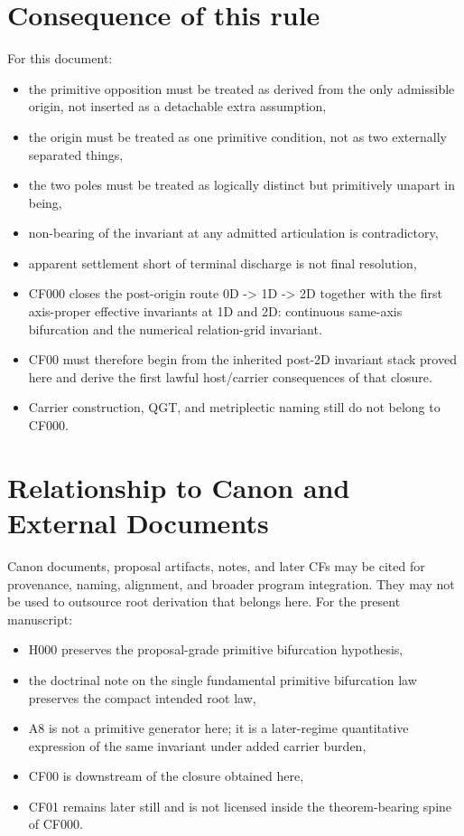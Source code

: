 \documentclass[11pt]{article}
\begin{document}
\section{Consequence of this rule}\label{consequence-of-this-rule}

For this document:

\begin{itemize}
\item
  the primitive opposition must be treated as derived from the only admissible origin, not inserted as a detachable extra assumption,
\item
  the origin must be treated as one primitive condition, not as two externally separated things,
\item
  the two poles must be treated as logically distinct but primitively unapart in being,
\item
  non-bearing of the invariant at any admitted articulation is contradictory,
\item
  apparent settlement short of terminal discharge is not final resolution,
\item
  CF000 closes the post-origin route 0D -\textgreater{} 1D -\textgreater{} 2D together with the first axis-proper effective invariants at 1D and 2D: continuous same-axis bifurcation and the numerical relation-grid invariant.
\item
  CF00 must therefore begin from the inherited post-2D invariant stack proved here and derive the first lawful host/carrier consequences of that closure.
\item
  Carrier construction, QGT, and metriplectic naming still do not belong to CF000.
\end{itemize}

\section{Relationship to Canon and External Documents}\label{relationship-to-canon-and-external-documents}

Canon documents, proposal artifacts, notes, and later CFs may be cited for provenance, naming, alignment, and broader program integration. They may not be used to outsource root derivation that belongs here. For the present manuscript:

\begin{itemize}
\item
  H000 preserves the proposal-grade primitive bifurcation hypothesis,
\item
  the doctrinal note on the single fundamental primitive bifurcation law preserves the compact intended root law,
\item
  A8 is not a primitive generator here; it is a later-regime quantitative expression of the same invariant under added carrier burden,
\item
  CF00 is downstream of the closure obtained here,
\item
  CF01 remains later still and is not licensed inside the theorem-bearing spine of CF000.
\end{itemize}
\end{document}
